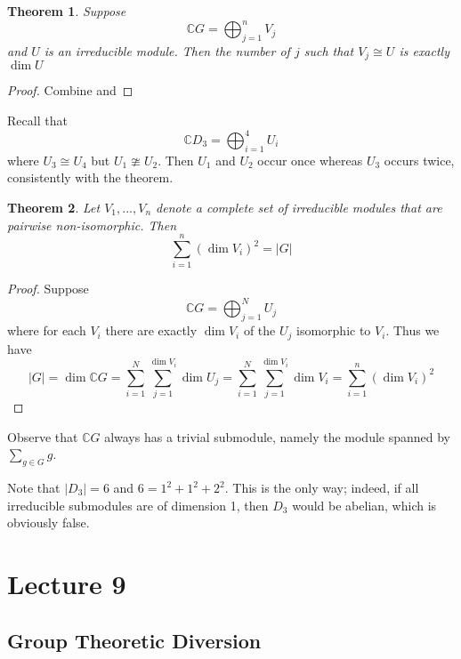 \documentclass[11pt, notitlepage]{article}
\numberwithin{equation}{section}
\theoremstyle{plain}
\newtheorem{theorem}{Theorem}[section]
\theoremstyle{definition}
\newenvironment{example}
	{\pushQED{\qed}\renewcommand{\qedsymbol}{$\blacktriangleleft$}\examplex}
	{\popQED\endexamplex}
\newcommand{\C}{\mathbb{C}}
\newcommand{\CG}{{\mathbb{C}G}}
\begin{document}
\begin{theorem}
	Suppose $$\CG = \bigoplus_{j = 1}^n V_j$$ and $U$ is an irreducible module. Then the number of $j$ such that $V_j\cong U$ is exactly $\dim U$
\end{theorem}
\begin{proof}
	Combine  and 
\end{proof}

\begin{example}
	Recall that $$\C D_3 = \bigoplus_{i = 1}^4 U_i$$ where $U_3 \cong U_4$ but $U_1 \ncong U_2$. Then $U_1$ and $U_2$ occur once whereas $U_3$ occurs twice, consistently with the theorem.
\end{example}

\begin{theorem}
	Let $V_1,...,V_n$ denote a complete set of irreducible modules that are pairwise non-isomorphic. Then \[\sum_{i = 1}^n (\dim V_i)^2 = |G|\]
\end{theorem}
\begin{proof}
	Suppose $$\CG = \bigoplus_{j = 1}^N U_j$$ where for each $V_i$ there are exactly $\dim V_i$ of the $U_j$ isomorphic to $V_i$. Thus we have $$|G| = \dim \CG = \sum_{i = 1}^N \sum_{j = 1}^{\dim V_i} \dim U_j = \sum_{i = 1}^N \sum_{j = 1}^{\dim V_i} \dim V_i = \sum_{i = 1}^n (\dim V_i)^2$$
\end{proof}

Observe that $\CG$ always has a trivial submodule, namely the module spanned by $\sum_{g\in G} g$.

\begin{example}
	Note that $|D_3| = 6$ and $6 = 1^2 + 1^2 + 2^2$. This is the only way; indeed, if all irreducible submodules are of dimension 1, then $D_3$ would be abelian, which is obviously false.
\end{example}












\section{Lecture 9}


\subsection{Group Theoretic Diversion}
\end{document}
